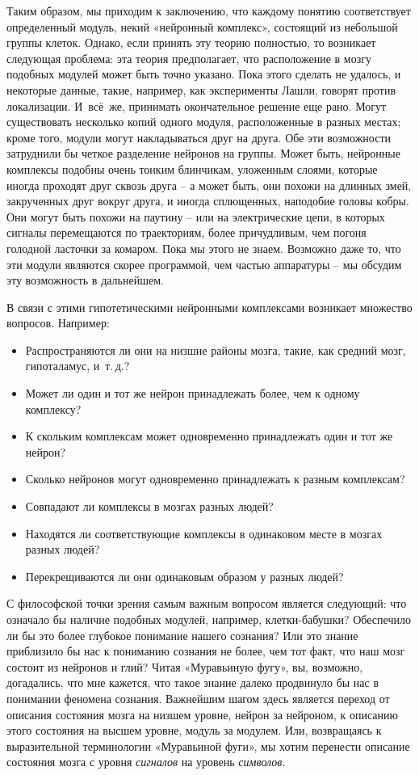 \documentclass[../main.tex]{subfiles}
\begin{document}
Таким образом, мы приходим к заключению, что каждому понятию соответствует определенный модуль, некий «нейронный комплекс», состоящий из небольшой группы клеток. Однако, если принять эту теорию полностью, то возникает следующая проблема: эта теория предполагает, что расположение в мозгу подобных модулей может быть точно указано. Пока этого сделать не удалось, и некоторые данные, такие, например, как эксперименты Лашли, говорят против локализации. И~всё~же, принимать окончательное решение еще рано. Могут существовать несколько копий одного модуля, расположенные в разных местах; кроме того, модули могут накладываться друг на друга. Обе эти возможности затруднили бы четкое разделение нейронов на группы. Может быть, нейронные комплексы подобны очень тонким блинчикам, уложенным слоями, которые иногда проходят друг сквозь друга \--- а может быть, они похожи на длинных змей, закрученных друг вокруг друга, и иногда сплющенных, наподобие головы кобры. Они могут быть похожи на паутину \--- или на электрические цепи, в которых сигналы перемещаются по траекториям, более причудливым, чем погоня голодной ласточки за комаром. Пока мы этого не знаем. Возможно даже то, что эти модули являются скорее программой, чем частью аппаратуры \--- мы обсудим эту возможность в дальнейшем.

В связи с этими гипотетическими нейронными комплексами возникает множество вопросов. Например:
\begin{itemize}[label={}, noitemsep, topsep=6pt]
    \item[]Распространяются ли они на низшие районы мозга, такие, как средний мозг, гипоталамус, и~т.\,д.?
    \item[] Может ли один и тот же нейрон принадлежать более, чем к одному комплексу?
    \item[] К скольким комплексам может одновременно принадлежать один и тот же нейрон?
    \item[] Сколько нейронов могут одновременно принадлежать к разным комплексам?
    \item[] Совпадают ли комплексы в мозгах разных людей?
    \item[] Находятся ли соответствующие комплексы в одинаковом месте в мозгах разных людей?
    \item[] Перекрещиваются ли они одинаковым образом у разных людей?
\end{itemize}


С философской точки зрения самым важным вопросом является следующий: что означало бы наличие подобных модулей, например, клетки-бабушки? Обеспечило ли бы это более глубокое понимание нашего сознания? Или это знание приблизило бы нас к пониманию сознания не более, чем тот факт, что наш мозг состоит из нейронов и глий? Читая «Муравьиную фугу», вы, возможно, догадались, что мне кажется, что такое знание далеко продвинуло бы нас в понимании феномена сознания. Важнейшим шагом здесь является переход от описания состояния мозга на низшем уровне, нейрон за нейроном, к описанию этого состояния на высшем уровне, модуль за модулем. Или, возвращаясь к выразительной терминологии «Муравьиной фуги», мы хотим перенести описание состояния мозга с уровня \emph{сигналов} на уровень \emph{символов}.
\end{document}
